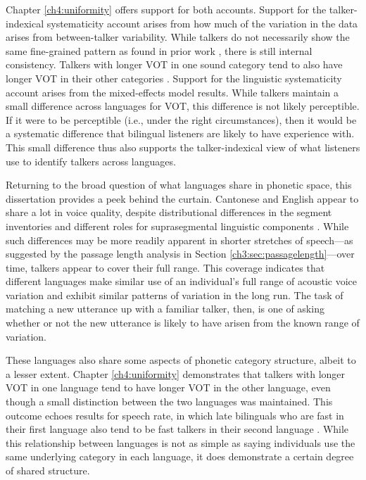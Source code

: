 Chapter \ref{ch4:uniformity} offers support for both accounts. Support for the talker-indexical systematicity account arises from how much of the variation in the data arises from between-talker variability. While talkers do not necessarily show the same fine-grained pattern as found in prior work \citep[e.g.,][]{chodroff_2017_structure}, there is still internal consistency. Talkers with longer VOT in one sound category tend to also have longer VOT in their other categories \citep[for a similar conclusion regarding speech rate, see][]{bradlow_2017_rate}. Support for the linguistic systematicity account arises from the mixed-effects model results. While talkers maintain a small difference across languages for VOT, this difference is not likely perceptible. If it were to be perceptible (i.e., under the right circumstances), then it would be a systematic difference that bilingual listeners are likely to have experience with. This small difference thus also supports the talker-indexical view of what listeners use to identify talkers across languages.

Returning to the broad question of what languages share in phonetic space, this dissertation provides a peek behind the curtain. Cantonese and English appear to share a lot in voice quality, despite distributional differences in the segment inventories and different roles for suprasegmental linguistic components \citep{matthews_2013_cantonese}. While such differences may be more readily apparent in shorter stretches of speech---as suggested by the passage length analysis in Section \ref{ch3:sec:passagelength}---over time, talkers appear to cover their full range. This coverage indicates that different languages make similar use of an individual's full range of acoustic voice variation and exhibit similar patterns of variation in the long run. The task of matching a new utterance up with a familiar talker, then, is one of asking whether or not the new utterance is likely to have arisen from the known range of variation.

These languages also share some aspects of phonetic category structure, albeit to a lesser extent. Chapter \ref{ch4:uniformity} demonstrates that talkers with longer VOT in one language tend to have longer VOT in the other language, even though a small distinction between the two languages was maintained. This outcome echoes results for speech rate, in which late bilinguals who are fast in their first language also tend to be fast talkers in their second language \citep{bradlow_2017_rate}. While this relationship between languages is not as simple as saying individuals use the same underlying category in each language, it does demonstrate a certain degree of shared structure.

